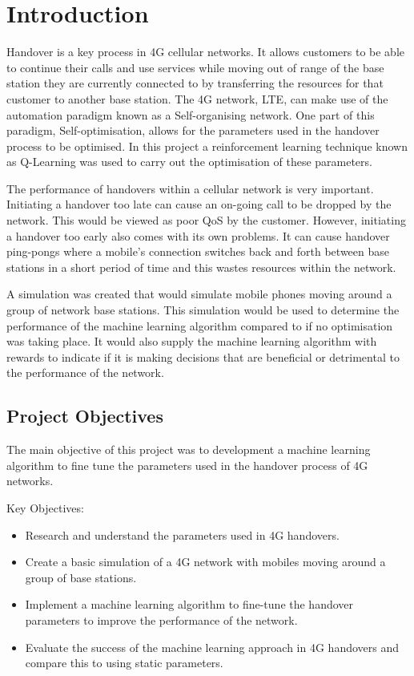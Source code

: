 \chapter{Introduction}
Handover is a key process in \ac{4G} cellular networks. It allows customers to be able to continue their calls and use services while moving out of range of the base station they are currently connected to by transferring the resources for that customer to another base station. The 4G network, \ac{LTE}, can make use of the automation paradigm known as a Self-organising network. One part of this paradigm, Self-optimisation, allows for the parameters used in the handover process to be optimised. In this project a reinforcement learning technique known as Q-Learning was used to carry out the optimisation of these parameters.

The performance of handovers within a cellular network is very important. Initiating a handover too late can cause an on-going call to be dropped by the network. This would be viewed as poor \ac{QoS} by the customer.  However, initiating a handover too early also comes with its own problems. It can cause handover ping-pongs where a mobile's connection switches back and forth between base stations in a short period of time and this wastes resources within the network.  

A simulation was created that would simulate mobile phones moving around a group of network base stations. This simulation would be used to determine the performance of the machine learning algorithm compared to if no optimisation was taking place. It would also supply the machine learning algorithm with rewards to indicate if it is making decisions that are beneficial or detrimental to the performance of the network.
\section{Project Objectives}\label{sec:obj}
The main objective of this project was to development a machine learning algorithm to fine tune the parameters used in the handover process of 4G networks.

Key Objectives:
\begin{itemize}
	\item Research and understand the parameters used in 4G handovers.
	\item Create a basic simulation of a 4G network with mobiles moving around a group of base stations.
	\item Implement a machine learning algorithm to fine-tune the handover parameters to improve the performance of the network.
	\item Evaluate the success of the machine learning approach in 4G handovers and compare this to using static parameters.
\end{itemize}

